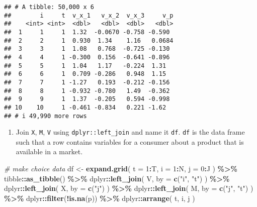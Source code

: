 \documentclass[
]{book}
\newenvironment{Shaded}{\begin{snugshade}}{\end{snugshade}}
\newcommand{\AttributeTok}[1]{\textcolor[rgb]{0.13,0.29,0.53}{#1}}
\newcommand{\CommentTok}[1]{\textcolor[rgb]{0.56,0.35,0.01}{\textit{#1}}}
\newcommand{\DecValTok}[1]{\textcolor[rgb]{0.00,0.00,0.81}{#1}}
\newcommand{\FunctionTok}[1]{\textcolor[rgb]{0.13,0.29,0.53}{\textbf{#1}}}
\newcommand{\NormalTok}[1]{#1}
\newcommand{\OtherTok}[1]{\textcolor[rgb]{0.56,0.35,0.01}{#1}}
\newcommand{\SpecialCharTok}[1]{\textcolor[rgb]{0.81,0.36,0.00}{\textbf{#1}}}
\newcommand{\StringTok}[1]{\textcolor[rgb]{0.31,0.60,0.02}{#1}}
\providecommand{\tightlist}{%
  \setlength{\itemsep}{0pt}\setlength{\parskip}{0pt}}
\begin{document}
\begin{verbatim}
## # A tibble: 50,000 x 6
##        i     t  v_x_1   v_x_2  v_x_3     v_p
##    <int> <int>  <dbl>   <dbl>  <dbl>   <dbl>
##  1     1     1  1.32  -0.0670 -0.758 -0.590 
##  2     2     1  0.930  1.34    1.16   0.0684
##  3     3     1  1.08   0.768  -0.725 -0.130 
##  4     4     1 -0.300  0.156  -0.641 -0.896 
##  5     5     1  1.04   1.17   -0.224  1.31  
##  6     6     1  0.709 -0.286   0.948  1.15  
##  7     7     1 -1.27   0.193  -0.212 -0.156 
##  8     8     1 -0.932 -0.780   1.49  -0.362 
##  9     9     1  1.37  -0.205   0.594 -0.998 
## 10    10     1 -0.461 -0.834   0.221 -1.62  
## # i 49,990 more rows
\end{verbatim}

\begin{enumerate}
\def\labelenumi{\arabic{enumi}.}
\setcounter{enumi}{4}
\tightlist
\item
  Join \texttt{X}, \texttt{M}, \texttt{V} using \texttt{dplyr::left\_join} and name it \texttt{df}. \texttt{df} is the data frame such that a row contains variables for a consumer about a product that is available in a market.
\end{enumerate}

\begin{Shaded}
\begin{Highlighting}[]
\CommentTok{\# make choice data}
\NormalTok{df }\OtherTok{\textless{}{-}} 
  \FunctionTok{expand.grid}\NormalTok{(}
    \AttributeTok{t =} \DecValTok{1}\SpecialCharTok{:}\NormalTok{T, }
    \AttributeTok{i =} \DecValTok{1}\SpecialCharTok{:}\NormalTok{N, }
    \AttributeTok{j =} \DecValTok{0}\SpecialCharTok{:}\NormalTok{J}
\NormalTok{    ) }\SpecialCharTok{\%\textgreater{}\%}
\NormalTok{  tibble}\SpecialCharTok{::}\FunctionTok{as\_tibble}\NormalTok{() }\SpecialCharTok{\%\textgreater{}\%}
\NormalTok{  dplyr}\SpecialCharTok{::}\FunctionTok{left\_join}\NormalTok{(}
\NormalTok{    V, }
    \AttributeTok{by =} \FunctionTok{c}\NormalTok{(}\StringTok{"i"}\NormalTok{, }\StringTok{"t"}\NormalTok{)}
\NormalTok{    ) }\SpecialCharTok{\%\textgreater{}\%}
\NormalTok{  dplyr}\SpecialCharTok{::}\FunctionTok{left\_join}\NormalTok{(}
\NormalTok{    X, }
    \AttributeTok{by =} \FunctionTok{c}\NormalTok{(}\StringTok{"j"}\NormalTok{)}
\NormalTok{    ) }\SpecialCharTok{\%\textgreater{}\%}
\NormalTok{  dplyr}\SpecialCharTok{::}\FunctionTok{left\_join}\NormalTok{(}
\NormalTok{    M, }
    \AttributeTok{by =} \FunctionTok{c}\NormalTok{(}\StringTok{"j"}\NormalTok{, }\StringTok{"t"}\NormalTok{)}
\NormalTok{    ) }\SpecialCharTok{\%\textgreater{}\%}
\NormalTok{  dplyr}\SpecialCharTok{::}\FunctionTok{filter}\NormalTok{(}\SpecialCharTok{!}\FunctionTok{is.na}\NormalTok{(p)) }\SpecialCharTok{\%\textgreater{}\%}
\NormalTok{  dplyr}\SpecialCharTok{::}\FunctionTok{arrange}\NormalTok{(}
\NormalTok{    t, }
\NormalTok{    i, }
\NormalTok{    j}
\NormalTok{    )}
\end{Highlighting}
\end{Shaded}
\end{document}
